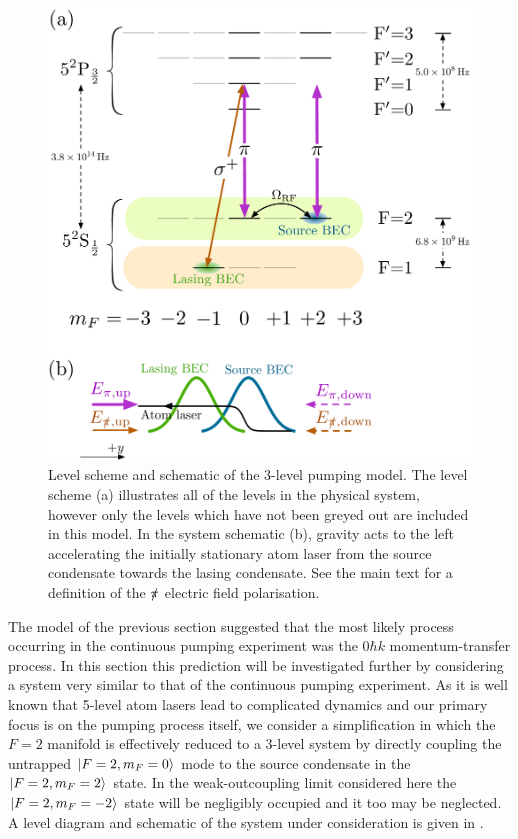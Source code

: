 \begin{figure}
    \centering
    \includegraphics[width=13cm]{3LevelModelLevelDiagram}
    \caption{Level scheme and schematic of the 3-level pumping model.  
    The level scheme (a) illustrates all of the levels in the physical system, however only the levels which have not been greyed out are included in this model.  
    In the system schematic (b), gravity acts to the left accelerating the initially stationary atom laser from the source condensate towards the lasing condensate.  See the main text for a definition of the $\slashed{\pi}$ electric field polarisation.}
    \label{OpticalPumping:3LevelModelLevelDiagram}
\end{figure}

The model of the previous section suggested that the most likely process occurring in the continuous pumping experiment was the $0 \hbar k$ momentum-transfer process.  In this section this prediction will be investigated further by considering a system very similar to that of the continuous pumping experiment.  As it is well known that 5-level atom lasers lead to complicated dynamics \citep{Dugue:2007fk} and our primary focus is on the pumping process itself, we consider a simplification in which the $F=2$ manifold is effectively reduced to a 3-level system by directly coupling the untrapped ${\left|F=2, m_F=0\right>}$ mode to the source condensate in the ${\left|F=2, m_F=2\right>}$ state.  In the weak-outcoupling limit considered here the ${\left|F=2, m_F=-2\right>}$ state will be negligibly occupied and it too may be neglected.  A level diagram and schematic of the system under consideration is given in .  

